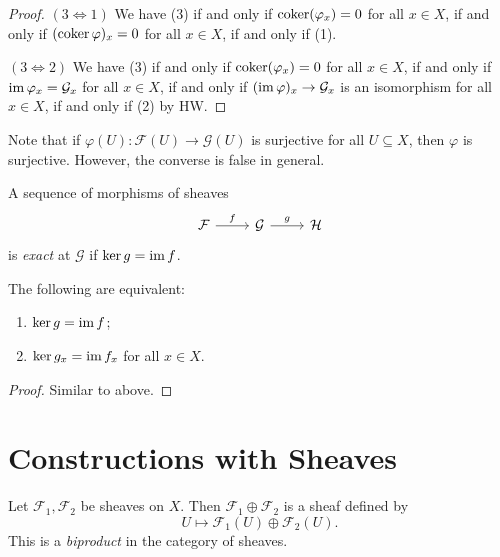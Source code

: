 \begin{proof}
  $(3 \Leftrightarrow 1)$
  We have (3) if and only if
  $\operatorname{coker}(\varphi_x) = 0$
  for all $x \in X$, if and only if
  $(\operatorname{coker} \varphi)_x = 0$ for all
  $x \in X$, if and only if (1).

  $(3 \Leftrightarrow 2)$
  We have (3) if and only if
  $\operatorname{coker}(\varphi_x) = 0$ for all
  $x \in X$, if and only if
  $\operatorname{im} \varphi_x = \mathcal{G}_x$
  for all $x \in X$, if and only if
  $(\operatorname{im} \varphi)_x \rightarrow \mathcal{G}_x$
  is an isomorphism for all
  $x \in X$, if and only if (2) by HW.
\end{proof}

\begin{remark}
  Note that if $\varphi(U) : \mathcal{F}(U) \to \mathcal{G}(U)$
  is surjective for all $U \subseteq X$, then
  $\varphi$ is surjective.
  However, the converse is false
  in general.
\end{remark}

\begin{definition}
  A sequence of morphisms of
  sheaves
  \[
    \begin{tikzcd}
      \mathcal{F} \ar[r, "f"]
      & \mathcal{G} \ar[r, "g"]
      & \mathcal{H}
    \end{tikzcd}
  \]
  is \emph{exact} at $\mathcal{G}$
  if $\ker g = \operatorname{im} f$.
\end{definition}

\begin{lemma}
  The following are equivalent:
  \begin{enumerate}
    \item $\ker g = \operatorname{im} f$;
    \item $\ker g_x = \operatorname{im} f_x$
      for all $x \in X$.
  \end{enumerate}
\end{lemma}

\begin{proof}
  Similar to above.
\end{proof}

\section{Constructions with Sheaves}

\begin{definition}
  Let $\mathcal{F}_1, \mathcal{F}_2$
  be sheaves on $X$. Then
  $\mathcal{F}_1 \oplus \mathcal{F}_2$
  is a sheaf defined by
  \[
    U \longmapsto
    \mathcal{F}_1(U) \oplus \mathcal{F}_2(U).
  \]
  This is a \emph{biproduct} in
  the category of sheaves.
\end{definition}

